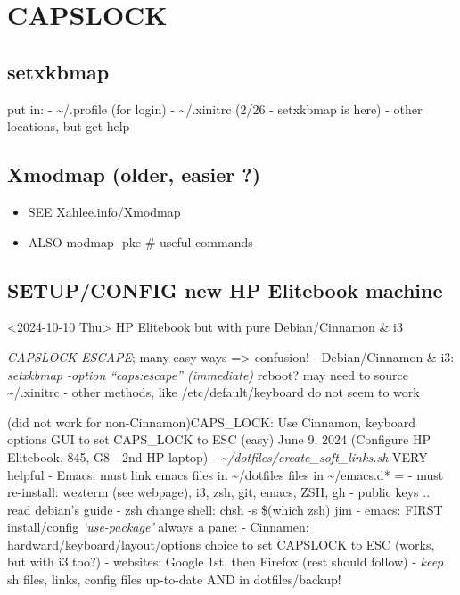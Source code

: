 \documentclass[
]{report}
\providecommand{\tightlist}{%
  \setlength{\itemsep}{0pt}\setlength{\parskip}{0pt}}\usepackage{longtable,booktabs,array}
\begin{document}
\section{CAPSLOCK}\label{capslock}

\subsection{setxkbmap}\label{setxkbmap}

put in: - \textasciitilde/.profile (for login) -
\textasciitilde/.xinitrc (2/26 - setxkbmap is here) - other locations,
but get help

\subsection{Xmodmap (older, easier ?)}\label{xmodmap-older-easier}

\begin{itemize}
\tightlist
\item
  SEE Xahlee.info/Xmodmap
\item
  ALSO modmap -pke \# useful commands
\end{itemize}

\subsection{SETUP/CONFIG new HP Elitebook
machine}\label{setupconfig-new-hp-elitebook-machine}

\textless2024-10-10 Thu\textgreater{} HP Elitebook but with pure
Debian/Cinnamon \& i3

\emph{CAPSLOCK ESCAPE}; many easy ways =\textgreater{} confusion! -
Debian/Cinnamon \& i3: \emph{setxkbmap -option ``caps:escape''
(immediate)} reboot? may need to source \textasciitilde/.xinitrc - other
methods, like /etc/default/keyboard do not seem to work

(did not work for non-Cinnamon)CAPS\_LOCK: Use Cinnamon, keyboard
options GUI to set CAPS\_LOCK to ESC (easy) June 9, 2024 (Configure HP
Elitebook, 845, G8 - 2nd HP laptop) -
\emph{\textasciitilde/dotfiles/create\_soft\_links.sh} VERY helpful -
Emacs: must link emacs files in \textasciitilde/dotfiles files in
\textasciitilde/emacs.d* = - must re-install: wezterm (see webpage), i3,
zsh, git, emacs, ZSH, gh - public keys .. read debian's guide - zsh
change shell: chsh -s \$(which zsh) jim - emacs: FIRST install/config
\emph{`use-package'} always a pane: - Cinnamen:
hardward/keyboard/layout/options choice to set CAPSLOCK to ESC (works,
but with i3 too?) - websites: Google 1st, then Firefox (rest should
follow) - \emph{keep} sh files, links, config files up-to-date AND in
dotfiles/backup!
\end{document}
